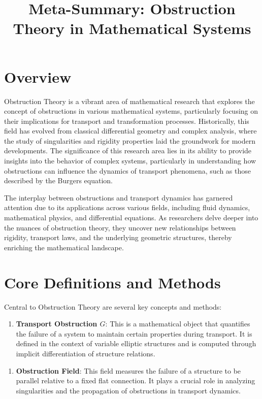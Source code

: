 \documentclass[11pt,a4paper]{article}
\title{Meta-Summary: Obstruction Theory in Mathematical Systems}
\date{}
\begin{document}
\maketitle

\section{Overview}

Obstruction Theory is a vibrant area of mathematical research that explores the concept of obstructions in various mathematical systems, particularly focusing on their implications for transport and transformation processes. Historically, this field has evolved from classical differential geometry and complex analysis, where the study of singularities and rigidity properties laid the groundwork for modern developments. The significance of this research area lies in its ability to provide insights into the behavior of complex systems, particularly in understanding how obstructions can influence the dynamics of transport phenomena, such as those described by the Burgers equation.

The interplay between obstructions and transport dynamics has garnered attention due to its applications across various fields, including fluid dynamics, mathematical physics, and differential equations. As researchers delve deeper into the nuances of obstruction theory, they uncover new relationships between rigidity, transport laws, and the underlying geometric structures, thereby enriching the mathematical landscape.

\section{Core Definitions and Methods}

Central to Obstruction Theory are several key concepts and methods:

\begin{enumerate}
\item \textbf{Transport Obstruction \( G \)}: This is a mathematical object that quantifies the failure of a system to maintain certain properties during transport. It is defined in the context of variable elliptic structures and is computed through implicit differentiation of structure relations.
\end{enumerate}

\begin{enumerate}
\item \textbf{Obstruction Field}: This field measures the failure of a structure to be parallel relative to a fixed flat connection. It plays a crucial role in analyzing singularities and the propagation of obstructions in transport dynamics.
\end{enumerate}
\end{document}
